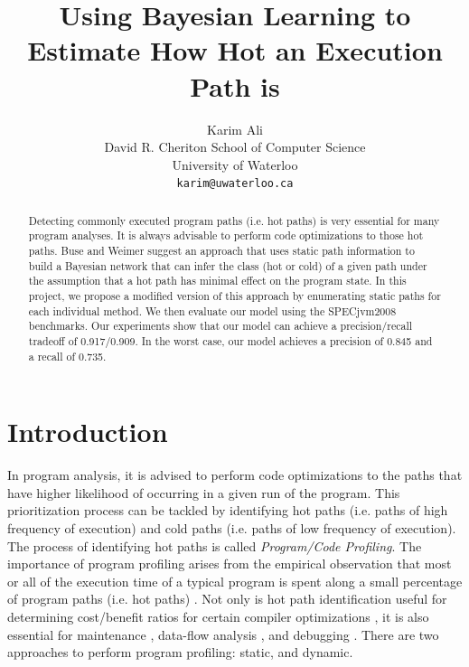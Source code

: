 \documentclass[10pt,twocolumn,letterpaper]{article}
\begin{document}
\title{Using Bayesian Learning to Estimate How Hot an Execution Path is}

\author{Karim Ali\\
David R. Cheriton School of Computer Science\\
University of Waterloo\\
{\tt\small karim@uwaterloo.ca}}

\maketitle
\thispagestyle{empty}

\begin{abstract}
Detecting commonly executed program paths (i.e. hot paths) is very essential for many program analyses. It is always advisable to perform code optimizations
to those hot paths. Buse and Weimer \cite{buse2009road} suggest an approach that uses static path information to build a Bayesian network that can infer the
class (hot or cold) of a given path under the assumption that a hot path has minimal effect on the program state. In this project, we propose a modified version
of this approach by enumerating static paths for each individual method. We then evaluate our model using the SPECjvm2008 \cite{specjvm2008} benchmarks. Our
experiments show that our model can achieve a precision/recall tradeoff of 0.917/0.909. In the worst case, our model achieves a precision of 0.845 and a recall
of 0.735.
\end{abstract}

\section{Introduction}
\label{sec:intro}
In program analysis, it is advised to perform code optimizations to the paths that have higher likelihood of occurring in a given run of the program. This
prioritization process can be tackled by identifying hot paths (i.e. paths of high frequency of execution) and cold paths (i.e. paths of low frequency of
execution). The process of identifying hot paths is called \textit{Program/Code Profiling}. The importance of program profiling arises from the empirical
observation that most or all of the execution time of a typical program is spent along a small percentage of program paths (i.e. hot paths) \cite{buse2009road}.
Not only is hot path identification useful for determining cost/benefit ratios for certain compiler optimizations \cite{boogerd2008use}, it is also essential
for maintenance \cite{reps1997use}, data-flow analysis \cite{ammons1998improving}, and debugging \cite{chilimbi2009holmes}. There are two approaches to perform
program profiling: static, and dynamic.
\end{document}
